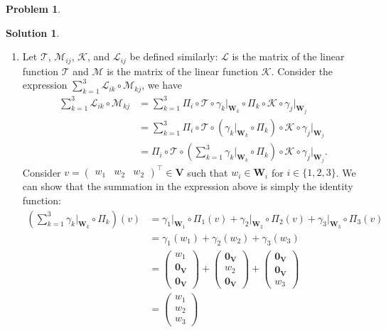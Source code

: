 \documentclass{article}
\theoremstyle{definition}
\newtheorem*{prob*}{Problem}
\newtheorem*{sln*}{Solution}
\newcommand{\V}{\mathbf{V}}
\newcommand{\W}{\mathbf{W}}
\newcommand{\lag}{\mathcal{L}}
\newcommand{\M}{\mathcal{M}}
\newcommand{\K}{\mathcal{K}}
\newcommand{\T}{\mathcal{T}}
\begin{document}
\begin{prob*}
\begin{sln*}
\begin{enumerate}
\begin{enumerate}
			\item Let $\T$, $\M_{ij}$, $\K$, and $\lag_{ij}$ be defined similarly: $\lag$ is the matrix of the linear function $\T$ and $\M$ is the matrix of the linear function $\K$. Consider the expression $\sum^3_{k=1}\lag_{ik}\circ \M_{kj}$, we have
			\begin{align*}
			\sum^3_{k=1} \lag_{ik} \circ \M_{kj} 
			&= \sum^3_{k=1}\Pi_i \circ \T \circ \gamma_k\bigg\vert_{\W_k} \circ \Pi_k \circ \K \circ \gamma_j\bigg\vert_{\W_j}\\
			&= \sum^3_{k=1} \Pi_i \circ \T \circ \left(\gamma_k\bigg\vert_{\W_k} \circ \Pi_k \right) \circ \K \circ \gamma_j\bigg\vert_{\W_j}\\
			&= \Pi_i \circ \T \circ \left(\sum_{k=1}^3 \gamma_k\bigg\vert_{\W_k} \circ \Pi_k \right) \circ \K \circ \gamma_j\bigg\vert_{\W_j}.
			\end{align*}
			Consider $v = \begin{pmatrix}w_1 & w_2 & w_2\end{pmatrix}^\top \in \V$ such that $w_i \in \W_i$ for $i\in \{1,2,3\}$. We can show that the summation in the expression above is simply the identity function:
			\begin{align*}
			\left(\sum_{k=1}^3 \gamma_k\bigg\vert_{\W_k} \circ \Pi_k \right)(v) 
			&=
			\gamma_1\bigg\vert_{\W_1} \circ \Pi_1(v) + \gamma_2\bigg\vert_{\W_2} \circ \Pi_2(v) + \gamma_3\bigg\vert_{\W_3} \circ \Pi_3(v)\\
			&= \gamma_1(w_1) + \gamma_2(w_2) + \gamma_3(w_3)\\
			&=\begin{pmatrix}
			w_1\\\mathbf{0}_\V \\ \mathbf{0}_\V
			\end{pmatrix} + \begin{pmatrix}
			\mathbf{0}_\V\\ w_2\\ \mathbf{0}_\V
			\end{pmatrix} + \begin{pmatrix}
			\mathbf{0}_\V \\ \mathbf{0}_\V \\ w_3
			\end{pmatrix}\\
			&=
			\begin{pmatrix}
			w_1\\w_2\\w_3
			\end{pmatrix}\\

\end{align*}
\end{enumerate}
\end{enumerate}
\end{sln*}
\end{prob*}
\end{document}
